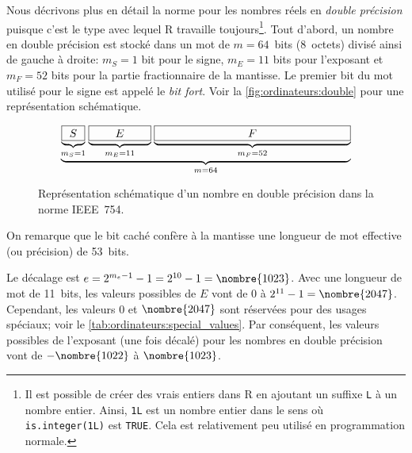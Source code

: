 \documentclass[letterpaper,11pt,english,french]{memoir}
\theoremstyle{plain}
\theoremstyle{definition}
\theoremstyle{remark}
\newcommand{\code}[1]{\texttt{#1}}
\begin{document}
Nous décrivons plus en détail la norme pour les nombres réels en
\emph{double précision} puisque c'est le type avec lequel R travaille
toujours\footnote{%
  \label{pg:arithmetique:entiers} Il est possible de créer des vrais
  entiers dans R en ajoutant un suffixe \code{L} à un nombre entier.
  Ainsi, \code{1L} est un nombre entier dans le sens où
  \code{is.integer(1L)} est \code{TRUE}. Cela est relativement peu
  utilisé en programmation normale.}. %
Tout d'abord, un nombre en double précision est stocké dans un mot de
$m = 64$~bits (8~octets) divisé ainsi de gauche à droite: $m_S = 1$ bit
pour le signe, $m_E = 11$ bits pour l'exposant et $m_F = 52$ bits pour
la partie fractionnaire de la mantisse. Le premier bit du mot utilisé
pour le signe est appelé le \emph{bit fort}. Voir la
\autoref{fig:ordinateurs:double} pour une représentation
schématique.

\begin{figure}
  \centering
  \begin{equation*}
    \underbrace{
      \underbrace{\fbox{\hspace{0.5pt} $S$ \hspace{0.5pt}}}_{m_S = 1}
      \hspace{1pt}
      \underbrace{\fbox{\hspace{17.5pt} $E$ \hspace{17.5pt}}}_{m_E = 11}
      \hspace{1pt}
      \underbrace{\fbox{\hspace{78pt} $F$ \hspace{78pt}}}_{m_F = 52}%
    }_{m = 64}
  \end{equation*}
  \caption{Représentation schématique d'un nombre en double précision
    dans la norme IEEE~754.}
  \label{fig:ordinateurs:double}
\end{figure}

On remarque que le bit caché confère à la mantisse une longueur de mot
effective (ou précision) de 53~bits.

Le décalage est $e = 2^{m_e - 1} - 1 = 2^{10} - 1 = \nombre{1023}$.
Avec une longueur de mot de 11~bits, les valeurs possibles de $E$ vont
de $0$ à $2^{11} - 1 = \nombre{2047}$. Cependant, les valeurs $0$ et
$\nombre{2047}$ sont réservées pour des usages spéciaux; voir le
\autoref{tab:ordinateurs:special_values}. Par conséquent, les
valeurs possibles de l'exposant (une fois décalé) pour les nombres en
double précision vont de $-\nombre{1022}$ à $\nombre{1023}$.
\end{document}
